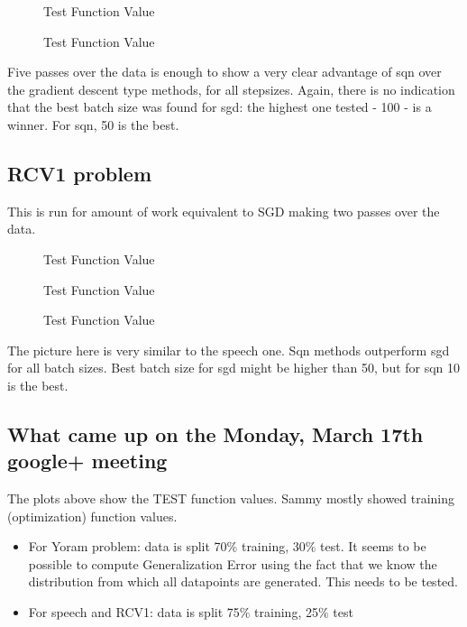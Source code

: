 \documentclass[12pt]{article}
\begin{document}
\begin{figure}[H]

\caption{Test Function Value}
\end{figure}
\begin{figure}[H]

\caption{Test Function Value}
\end{figure}
Five passes over the data is enough to show a very clear advantage of sqn over the gradient descent type methods, for all stepsizes. Again, there is no indication that the best batch size was found for sgd: the highest one tested - 100 - is a winner. For sqn, 50 is the best. 

\newpage

\subsection{RCV1 problem}
This is run for amount of work equivalent to SGD making two passes over the data.

\begin{figure}[H]

\caption{Test Function Value}
\end{figure}
\begin{figure}[H]

\caption{Test Function Value}
\end{figure}
\begin{figure}[H]

\caption{Test Function Value}
\end{figure}
The picture here is very similar to the speech one. Sqn methods outperform sgd for all batch sizes. Best batch size for sgd might be higher than 50, but for sqn 10 is the best. 

\subsection{What came up on the Monday, March 17th google+ meeting}

The plots above show the TEST function values. Sammy mostly showed training (optimization) function values. 
\begin{itemize}
	\item For Yoram problem: data is split 70\% training, 30\% test. It seems to be possible to compute Generalization Error using the fact that we know the distribution from which all datapoints are generated. This needs to be tested.
	\item For speech and RCV1: data is split 75\% training, 25\% test
\end{itemize}
\end{document}

